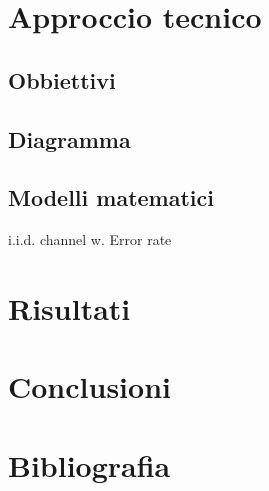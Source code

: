 \documentclass[italian, 11pt]{article}
\begin{document}
\section{Approccio tecnico}
\subsection{Obbiettivi}
\subsection{Diagramma}
\subsection{Modelli matematici}
i.i.d. channel w. Error rate\\

\section{Risultati}

\section{Conclusioni}

\section{Bibliografia}
\end{document}
